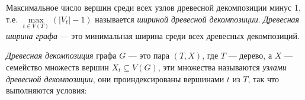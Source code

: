 \documentclass[a4paper,12pt]{article}
\begin{document}
\begin{large}
\begin{large}
\begin{comment}
		{\it Древесная декомпозиция} графа $G$ --- это $T = (X, Y)$, где $T$ -- дерево, $X$ --- это семейство множеств вершин $X_t$, где $X_t$ -- подмножество вершин $V(G)$ $(X_t \subseteq V(G))$, $Y$ -- множество ребер между узлами $X$, $X$ и $Y$ устроены так, что выполняется следующее:
			
			1.  $T=(X, Y) \forall e=(a, b) \in G \exists x \in X: a, b \in X_t$ Для каждого ребра $e$ из $G$ существует узел $x$ из $T$ такой, что оба конца ребра $e$ принадлежат какому-то узлу $X_t$  из $X(T)$ (Т.е. для любого ребра из графа $G$ найдется узел в древесной декомпозиции включающий оба конца данного ребра).

			2.  $T=(X, Y) \forall v \in G \exists P=(X_1, Y_1): X_1 = \{X_t | v \in X_t\}, Y_1 : \forall X_1, X_2 \exists P_t(X_1, X_2)$ Для всех вершин $v$ графа $G$ поддерево $P \subseteq T$ порожденное множеством $\{v \in X_t\}$, где $X_t$ -- узел k-дерева $T$, связно (т.е. связны все узлы в древесной декомпозиции которые включают в себя вершину $v$)  (свойство интерполяции).
 			
			3. $ \bigcup_{X_t \in X} {X_t} = V(G) $, где $X_t$ -- узел k-дерева $T$.  Объединение всех $X_t$ в $X$ равно множеству вершин $G$ (т.е. древесная декомпозиция включает в себя все вершины).
		

		\end{comment}
		\begin{comment}
		Пусть $G=(V, E)$ --- граф, тогда {\it древесная декомпозиция} графа $G$ это дерево $T=(V_1, E_1)$, где:.
			
		1. Каждая вершина, $i$ из $T$ помечена подмножеством $B_i \subset V$, который называют узлом древесной декомпозиции. 

		2. Каждое ребро из $G$ находится в подграфе, порождённом хотя бы одним $B_i$.

		3. Поддерево $T$, состоящее из всех узлов, содержащих $u$, связно для всех вершин $u$ в $G$.
		\end{comment}
		
		Максимальное число вершин среди всех узлов древесной декомпозиции минус 1, т.е. $\max \limits_{t \in V(T)} (|V_t| - 1)$ называется {\it шириной древесной декомпозиции}.
		{\it Древесная ширина графа} --- это минимальная ширина среди всех древесных декомпозиций.
		
		\newenvironment{comment}{}{}

		\begin{comment}
			{\it Древесная декомпозиция} графа $G$ --- это пара $(T, X)$, где $T$ --- дерево, а $X$ --- семейство множеств вершин $X_t \subseteq V(G)$, эти множества называются {\it узлами древесной декомпозиции}, 
		они проиндексированы вершинами $t$ из $T$, так что выполняются условия:


\end{comment}
\end{large}
\end{large}
\end{document}
